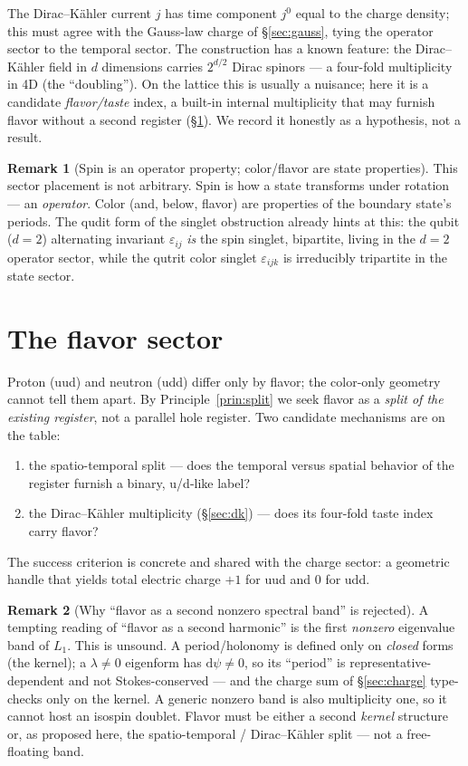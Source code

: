 \documentclass[11pt]{article}
\theoremstyle{definition}
\newtheorem{remark}{Remark}
\newcommand{\dd}{\mathrm{d}}
\begin{document}
The Dirac--K\"ahler current $j$ has time component $j^0$ equal to the charge density;
this must agree with the Gauss-law charge of \S\ref{sec:gauss}, tying the operator sector
to the temporal sector. The construction has a known feature: the Dirac--K\"ahler field
in $d$ dimensions carries $2^{d/2}$ Dirac spinors --- a four-fold multiplicity in 4D (the
``doubling''). On the lattice this is usually a nuisance; here it is a candidate
\emph{flavor/taste} index, a built-in internal multiplicity that may furnish flavor
without a second register (\S\ref{sec:flavor}). We record it honestly as a hypothesis,
not a result.

\begin{remark}[Spin is an operator property; color/flavor are state properties]
This sector placement is not arbitrary. Spin is how a state transforms under rotation ---
an \emph{operator}. Color (and, below, flavor) are properties of the boundary state's
periods. The qudit form of the singlet obstruction already hints at this: the
qubit ($d{=}2$) alternating invariant $\varepsilon_{ij}$ \emph{is} the spin singlet,
bipartite, living in the $d{=}2$ operator sector, while the qutrit color singlet
$\varepsilon_{ijk}$ is irreducibly tripartite in the state sector.
\end{remark}

\section{The flavor sector}
\label{sec:flavor}

Proton (uud) and neutron (udd) differ only by flavor; the color-only geometry cannot tell
them apart. By Principle~\ref{prin:split} we seek flavor as a \emph{split of the existing
register}, not a parallel hole register. Two candidate mechanisms are on the table:
\begin{enumerate}[nosep,label=(\roman*)]
  \item the spatio-temporal split --- does the temporal versus spatial behavior of the
  register furnish a binary, u/d-like label?
  \item the Dirac--K\"ahler multiplicity (\S\ref{sec:dk}) --- does its four-fold
  taste index carry flavor?
\end{enumerate}
The success criterion is concrete and shared with the charge sector: a geometric handle
that yields total electric charge $+1$ for uud and $0$ for udd.

\begin{remark}[Why ``flavor as a second nonzero spectral band'' is rejected]
A tempting reading of ``flavor as a second harmonic'' is the first \emph{nonzero}
eigenvalue band of $L_1$. This is unsound. A period/holonomy is defined only on
\emph{closed} forms (the kernel); a $\lambda\neq0$ eigenform has $\dd\psi\neq0$, so its
``period'' is representative-dependent and not Stokes-conserved --- and the charge sum of
\S\ref{sec:charge} type-checks only on the kernel. A generic nonzero band is also
multiplicity one, so it cannot host an isospin doublet. Flavor must be either a second
\emph{kernel} structure or, as proposed here, the spatio-temporal / Dirac--K\"ahler split
--- not a free-floating band.
\end{remark}
\end{document}
